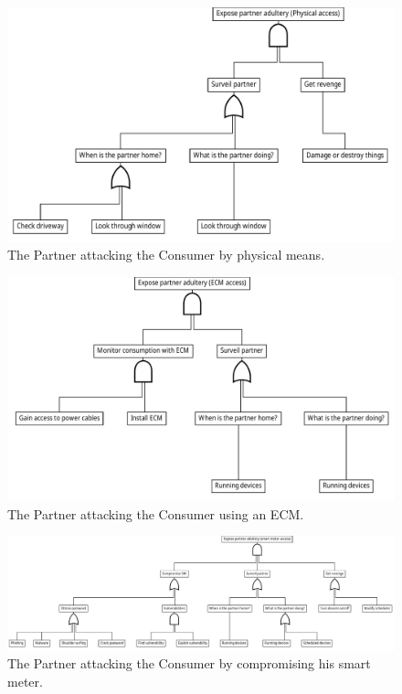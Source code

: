 \begin{figure}[h]
  \centering
  \includegraphics[width=\textwidth]{figures/graphviz/partner_vs_consumer_physical.pdf}
  \caption{The Partner attacking the Consumer by physical means.}
  \label{fig:attack_trees:partner:cheater_physical}
\end{figure}

\begin{figure}[h]
  \centering
  \includegraphics[width=\textwidth]{figures/graphviz/partner_vs_consumer_ecm.pdf}
  \caption{The Partner attacking the Consumer using an ECM.}
  \label{fig:attack_trees:partner:cheater_ecm}
\end{figure}

\begin{figure}[h]
  \centering
  \includegraphics[width=\textwidth]{figures/graphviz/partner_vs_consumer_sm.pdf}
  \caption{The Partner attacking the Consumer by compromising his smart meter.}
  \label{fig:attack_trees:partner:cheater_sm}
\end{figure}

